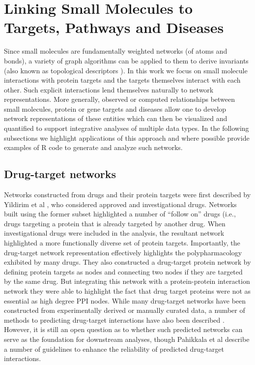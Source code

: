 \documentclass[]{book}
\begin{document}
\section{Linking Small Molecules to Targets, Pathways and Diseases}
\label{sec:link-small-molec}

Since small molecules are fundamentally weighted networks (of atoms
and bonds), a variety of graph algorithms can be applied to them to
derive invariants (also known as topological descriptors
\cite{Guha:2012vn}). In this work we focus on small molecule
interactions with protein targets and the targets themselves interact
with each other. Such explicit interactions lend themselves naturally
to network representations. More generally, observed or computed
relationships between small molecules, protein or gene targets and
diseases allow one to develop network representations of these
entities which can then be visualized and quantified to support
integrative analyses of multiple data types. In the following
subsections we highlight applications of this approach and where
possible provide examples of R code to generate and analyze such
networks.

\subsection{Drug-target networks}
\label{sec:drug-target-networks}

Networks constructed from drugs and their protein targets were first
described by Yildirim et al \cite{Yildirim:2007aa}, who considered
approved and investigational drugs. Networks built using the former
subset highlighted a number of ``follow on'' drugs (i.e., drugs
targeting a protein that is already targeted by another drug. When
investigational drugs were included in the analysis, the resultant
network highlighted a more functionally diverse set of protein
targets. Importantly, the drug-target network representation
effectively highlights the polypharmacology exhibited by many
drugs. They also constructed a drug-target protein network by defining
protein targets as nodes and connecting two nodes if they are targeted
by the same drug. But integrating this network with a protein-protein
interaction network they were able to highlight the fact that drug
target proteins were not as essential \cite{Jeong:2001gd} as high
degree PPI nodes. While many drug-target networks have been
constructed from experimentally derived or manually curated data, a
number of methods to predicting drug-target interactions have also
been described
\cite{Alaimo:2013ev,Wang:2013mw,Heiskanen:2013rc}. However, it is
still an open question as to whether such predicted networks can serve
as the foundation for downstream analyses, though Pahikkala et al
\cite{Pahikkala:2014gt} describe a number of guidelines to enhance the
reliability of predicted drug-target interactions.
\end{document}
